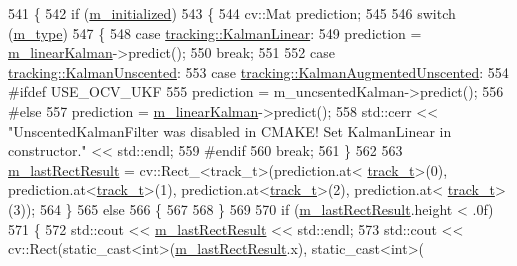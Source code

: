 \begin{DoxyCode}
541 \{
542     \textcolor{keywordflow}{if} (\mbox{\hyperlink{class_t_kalman_filter_a5633e302e878261c8669816695f6a314}{m\_initialized}})
543     \{
544         cv::Mat prediction;
545 
546         \textcolor{keywordflow}{switch} (\mbox{\hyperlink{class_t_kalman_filter_a00cabc6683f6cc848559515df46d7101}{m\_type}})
547         \{
548         \textcolor{keywordflow}{case} \mbox{\hyperlink{namespacetracking_a83f2c4d58ea2737f7d6296dce3eb722aa889eca583e371386c92e05814797a885}{tracking::KalmanLinear}}:
549             prediction = \mbox{\hyperlink{class_t_kalman_filter_aec607aacb57ef1f78e514c6b3ef18435}{m\_linearKalman}}->predict();
550             \textcolor{keywordflow}{break};
551 
552         \textcolor{keywordflow}{case} \mbox{\hyperlink{namespacetracking_a83f2c4d58ea2737f7d6296dce3eb722aa39d914d61ae37e52ad325f55d199dabc}{tracking::KalmanUnscented}}:
553         \textcolor{keywordflow}{case} \mbox{\hyperlink{namespacetracking_a83f2c4d58ea2737f7d6296dce3eb722aa442bc8be9c68f72f1bc7952153cbf4c7}{tracking::KalmanAugmentedUnscented}}:
554 \textcolor{preprocessor}{#ifdef USE\_OCV\_UKF}
555             prediction = m\_uncsentedKalman->predict();
556 \textcolor{preprocessor}{#else}
557             prediction = \mbox{\hyperlink{class_t_kalman_filter_aec607aacb57ef1f78e514c6b3ef18435}{m\_linearKalman}}->predict();
558             std::cerr << \textcolor{stringliteral}{"UnscentedKalmanFilter was disabled in CMAKE! Set KalmanLinear in constructor."} <<
       std::endl;
559 \textcolor{preprocessor}{#endif}
560             \textcolor{keywordflow}{break};
561         \}
562 
563         \mbox{\hyperlink{class_t_kalman_filter_aed4818c7aac455928ef02dd03f8bfe56}{m\_lastRectResult}} = cv::Rect\_<track\_t>(prediction.at<
      \mbox{\hyperlink{defines_8h_a7ce9c8817b42ab418e61756f579549ab}{track\_t}}>(0), prediction.at<\mbox{\hyperlink{defines_8h_a7ce9c8817b42ab418e61756f579549ab}{track\_t}}>(1), prediction.at<\mbox{\hyperlink{defines_8h_a7ce9c8817b42ab418e61756f579549ab}{track\_t}}>(2), prediction.at<
      \mbox{\hyperlink{defines_8h_a7ce9c8817b42ab418e61756f579549ab}{track\_t}}>(3));
564     \}
565     \textcolor{keywordflow}{else}
566     \{
567 
568     \}
569 
570     \textcolor{keywordflow}{if} (\mbox{\hyperlink{class_t_kalman_filter_aed4818c7aac455928ef02dd03f8bfe56}{m\_lastRectResult}}.height < .0f)
571     \{
572         std::cout << \mbox{\hyperlink{class_t_kalman_filter_aed4818c7aac455928ef02dd03f8bfe56}{m\_lastRectResult}} << std::endl;
573         std::cout << cv::Rect(static\_cast<int>(\mbox{\hyperlink{class_t_kalman_filter_aed4818c7aac455928ef02dd03f8bfe56}{m\_lastRectResult}}.x), static\_cast<int>(

\end{DoxyCode}
